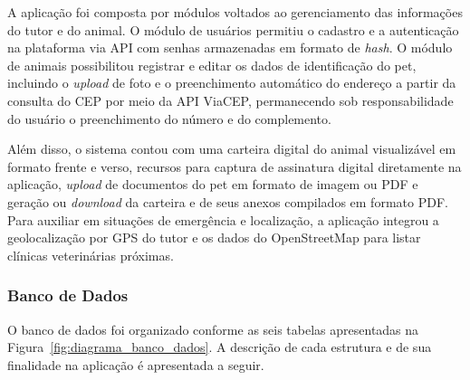 \documentclass{UNESC}
\begin{document}
A aplicação foi composta por módulos voltados ao gerenciamento das informações do tutor e do animal. O módulo de usuários permitiu o cadastro e a autenticação na plataforma via API com senhas armazenadas em formato de \textit{hash}. O módulo de animais possibilitou registrar e editar os dados de identificação do pet, incluindo o \textit{upload} de foto e o preenchimento automático do endereço a partir da consulta do CEP por meio da API ViaCEP, permanecendo sob responsabilidade do usuário o preenchimento do número e do complemento.

Além disso, o sistema contou com uma carteira digital do animal visualizável em formato frente e verso, recursos para captura de assinatura digital diretamente na aplicação, \textit{upload} de documentos do pet em formato de imagem ou PDF e geração ou \textit{download} da carteira e de seus anexos compilados em formato PDF. Para auxiliar em situações de emergência e localização, a aplicação integrou a geolocalização por GPS do tutor e os dados do OpenStreetMap para listar clínicas veterinárias próximas.

















\subsubsection{Banco de Dados}

O banco de dados foi organizado conforme as seis tabelas apresentadas na Figura~\ref{fig:diagrama_banco_dados}. A descrição de cada estrutura e de sua finalidade na aplicação é apresentada a seguir.
\end{document}
